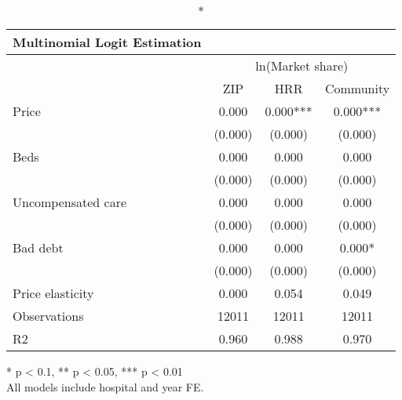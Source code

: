 \setlength{\LTpost}{0mm}
\begin{longtable}{lccc}
\caption*{
{\large Multinomial Logit Estimation}
} \\ 
\toprule
 & \multicolumn{3}{c}{ln(Market share)} \\ 
\cmidrule(lr){2-4}
  & ZIP & HRR & Community \\ 
\midrule\addlinespace[2.5pt]
Price & 0.000 & 0.000*** & 0.000*** \\ 
 & (0.000) & (0.000) & (0.000) \\ 
Beds & 0.000 & 0.000 & 0.000 \\ 
 & (0.000) & (0.000) & (0.000) \\ 
Uncompensated care & 0.000 & 0.000 & 0.000 \\ 
 & (0.000) & (0.000) & (0.000) \\ 
Bad debt & 0.000 & 0.000 & 0.000* \\ 
 & (0.000) & (0.000) & (0.000) \\ 
Price elasticity & 0.000 & 0.054 & 0.049 \\ 
Observations & 12011 & 12011 & 12011 \\ 
R2 & 0.960 & 0.988 & 0.970 \\ 
\bottomrule
\end{longtable}
\begin{minipage}{\linewidth}
* p < 0.1, ** p < 0.05, *** p < 0.01\\
All models include hospital and year FE.\\
\end{minipage}


